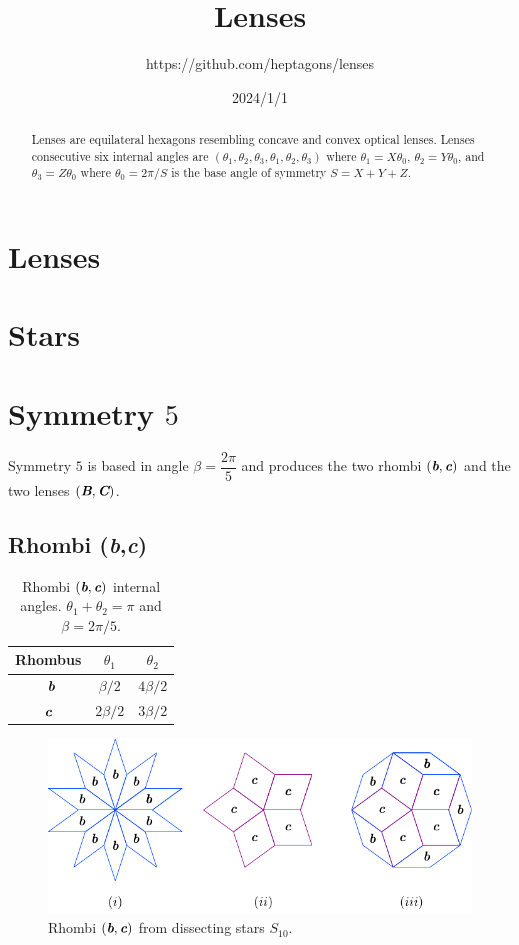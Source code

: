 \documentclass[11pt]{article}
\title{Lenses}
\author{https://github.com/heptagons/lenses}
\date{2024/1/1}
\def\mathbi#1{\textbf{\em #1}}
\begin{document}
\maketitle
\begin{abstract}
Lenses are equilateral hexagons resembling concave and convex optical lenses. Lenses consecutive six internal angles are $(\theta_1,\theta_2,\theta_3,\theta_1,\theta_2,\theta_3)$ where $\theta_1=X\theta_0$, $\theta_2=Y\theta_0$, and $\theta_3=Z\theta_0$ where $\theta_0 = 2\pi/S$ is the base angle of symmetry $S = X + Y + Z$.
\end{abstract}

\section{Lenses}

\section{Stars}


\section{Symmetry $5$}

Symmetry $5$ is based in angle $\beta = \dfrac{2\pi}5$ and produces the two rhombi $(\mathbi{b},\mathbi{c})$ and the two lenses $(\mathbi{B},\mathbi{C})$.

\subsection{Rhombi (\mathbi{b},\mathbi{c})}

\begin{table}[H]
\begin{center}
\begin{tabular}{|c|c c|}
\hline
Rhombus & $\theta_1$ & $\theta_2$ \\ \hline\
$\mathbi{b}$ & $\beta/2$ & $4\beta/2$ \\[0.5ex] \hline
$\mathbi{c}$ & $2\beta/2$ & $3\beta/2$ \\[0.5ex] \hline
\end{tabular}
\caption{Rhombi $(\mathbi{b},\mathbi{c})$ internal angles. $\theta_1 + \theta_2 = \pi$ and $\beta = 2\pi/5$.} 
\label{tbl:bc-angles}
\end{center}
\end{table}

\begin{figure}[H]
\centering
\includegraphics[scale=1.1]{bc/rhombi}
\caption{Rhombi $(\mathbi{b},\mathbi{c})$ from dissecting stars $S_{10}$.}
\label{fig:bc-rhombi}
\end{figure}
\end{document}
